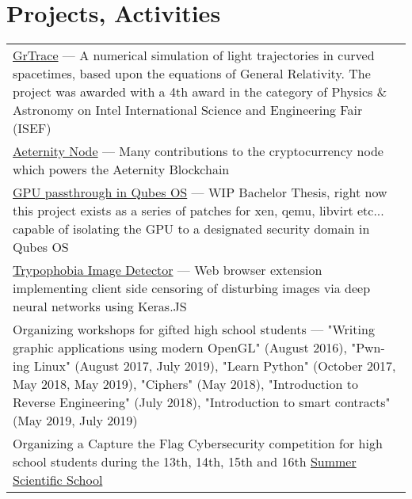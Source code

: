 
\section{\sc Projects, Activities}
\begin{tabular}{@{\llap{\textbullet{ }}~}p{5.15in}}
     \href{https://github.com/grtrace/grtrace}{GrTrace} ---  A numerical simulation of light trajectories in curved spacetimes, based upon the equations of General Relativity. The project was awarded with a 4th award in the category of Physics \& Astronomy on Intel International Science and Engineering Fair (ISEF) \\

     \href{https://github.com/aeternity/aeternity}{Aeternity Node} --- Many contributions to the cryptocurrency node which powers the Aeternity Blockchain \\

     \href{www.qubes-os.org}{GPU passthrough in Qubes OS}  --- WIP Bachelor Thesis, right now this project exists as a series of patches for xen, qemu, libvirt etc... capable of isolating the GPU to a designated security domain in Qubes OS \\

     \href{https://github.com/cytadela8/trypophobia}{Trypophobia Image Detector} --- Web browser extension implementing client side censoring of disturbing images via deep neural networks using Keras.JS \\
     
     Organizing workshops for gifted high school students --- "Writing graphic applications using modern OpenGL" (August 2016), "Pwn-ing Linux" (August 2017, July 2019), "Learn Python" (October 2017, May 2018, May 2019), "Ciphers" (May 2018), "Introduction to Reverse Engineering" (July 2018), "Introduction to smart contracts" (May 2019, July 2019) \\
     
     Organizing a Capture the Flag Cybersecurity competition for high school students during the 13th, 14th, 15th and 16th \href{https://warsztatywww.pl/article/en-indie-camp-for-hs-geeks/}{Summer Scientific School}
     
\end{tabular}
\vspace{-0.3in}